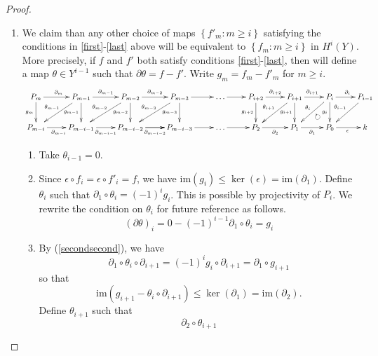 \documentclass[12pt]{article}
\newcounter{savedenumii}
\begin{document}
\begin{proof}
\begin{enumerate}
\item\label{otherf}
We claim than any other choice of maps
$\left\{f'_m:m\ge i\right\}$ 
satisfying the conditions in \ref{first}-\ref{last} above
will be equivalent to
$\left\{f_m:m\ge i\right\}$ in $H^i\left(Y\right)$.
More precisely, if $f$ and $f'$ both satisfy
conditions \ref{first}-\ref{last}, 
then will define a map $\theta\in Y^{i-1}$
such that $\partial\theta=f-f'$.
Write $g_m=f_m-f'_m$ for $m\ge i$.
\begin{equation}
\begin{xy}{\xymatrix{
P_m\ar[r]^{\partial_m}\ar[d]_{g_m}
&P_{m-1}\ar[r]^{\partial_{m-1}}\ar[d]_{g_{m-1}}
\ar[dl]_{\theta_{m-1}}
&P_{m-2}\ar[r]^{\partial_{m-2}}\ar[d]_{g_{m-2}}
\ar[dl]_{\theta_{m-2}}
&P_{m-3}\ar[r]\ar[d]_{g_{m-3}}
\ar[dl]_{\theta_{m-3}}
&\dots\ar[r]
&P_{i+2}\ar[r]^{\partial_{i+2}}\ar[d]_{g_{i+2}}
&P_{i+1}\ar[r]^{\partial_{i+1}}\ar[d]_{g_{i+1}}
\ar[dl]_{\theta_{i+1}}
&P_i\ar[d]_{g_i}\ar[dl]_{\theta_i}\ar[r]^{\partial_{i}}
&P_{i-1}\ar[dl]_{\theta_{i-1}}
\\
P_{m-i}\ar[r]_{\partial_{m-i}}
&P_{m-i-1}\ar[r]_{\partial_{m-i-1}}
&P_{m-i-2}\ar[r]\ar[r]_{\partial_{m-i-2}}
&P_{m-i-3}\ar[r]
&\dots\ar[r]
&P_2\ar[r]_{\partial_2}
&P_1\ar[r]_{\partial_1}
&P_0\ar[r]_\epsilon
&k
}};
"2,8";"1,7"**{};
?(.35)*{\circlearrowright}
\end{xy}
\end{equation}
\begin{enumerate}
\setcounter{enumii}{\value{savedenumii}}
\item\label{secondfirst} Take $\theta_{i-1}=0$.
\item\label{secondsecond}
Since $\epsilon\circ f_i=\epsilon\circ f'_i=f$, we have
$\mathrm{im}\left(g_i\right)\le
\ker\left(\epsilon\right)=\mathrm{im}\left(\partial_1\right)$.
Define $\theta_i$ such that $\partial_1\circ\theta_i=\left(-1\right)^i g_i$.
This is possible by projectivity of $P_i$.
We rewrite the condition on $\theta_i$ for future reference as follows.
\begin{equation}\label{t1}
\left(\partial\theta\right)_i=
0-\left(-1\right)^{i-1}\partial_1\circ\theta_i=g_i
\end{equation}
\item By (\ref{secondsecond}), we have
\[\partial_1\circ\theta_i\circ\partial_{i+1}
=\left(-1\right)^i g_i\circ\partial_{i+1}
=\partial_1\circ g_{i+1}
\] so that 
\[\mathrm{im}\left(g_{i+1}-\theta_i\circ\partial_{i+1}\right)
\le\ker\left(\partial_1\right)=\mathrm{im}\left(\partial_2\right).\]
Define $\theta_{i+1}$
such that \[\partial_2\circ\theta_{i+1}
\]
\end{enumerate}
\end{enumerate}
\end{proof}
\end{document}
